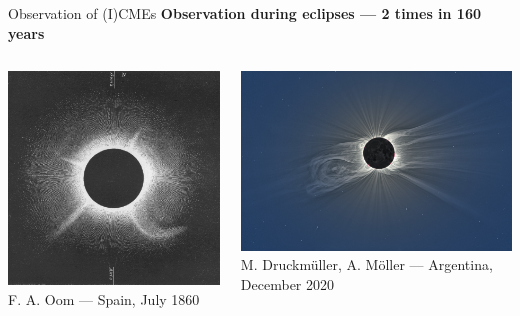 \documentclass[10pt,aspectratio=169,usenames,dvipsnames]{beamer}
\begin{document}
\begin{frame}{Observation of (I)CMEs}
\centering
\textbf{Observation during eclipses --- 2 times in 160 years}
\vskip2mm
\begin{columns}
	\begin{column}{0.35\textwidth}
		\centering
		\includegraphics[height=0.32\paperwidth]{../images/oldcme3.png}\\
		F. A. Oom --- Spain, July 1860
	\end{column}
	\begin{column}{0.6\textwidth}
		\centering
		\includegraphics[height=0.32\paperwidth]{images/druckmueller_2020_eclipse_enhanced.png}\\
		M. Druckmüller, A. Möller --- Argentina, December 2020
	\end{column}
\end{columns}
\end{frame}
\end{document}
